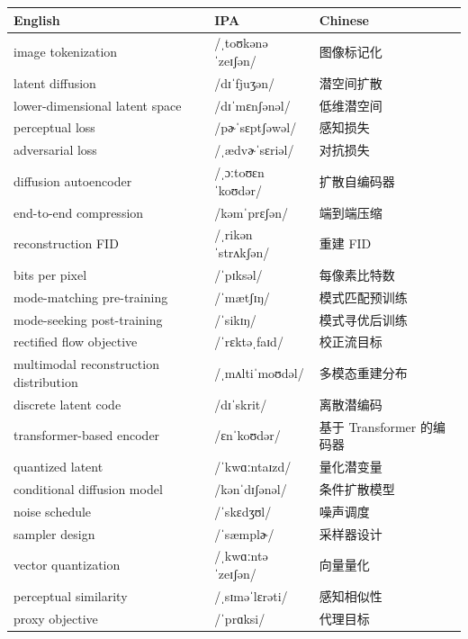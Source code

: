 \documentclass[UTF8,12pt,a4paper]{ctexart}
\providecommand{\zh}[1]{#1}
\begin{document}
\begin{tabular*}{\textwidth}{@{\extracolsep{\fill}}lll@{}}
\toprule
\textbf{English} & \textbf{IPA} & \textbf{Chinese} \\
\midrule
image tokenization & {\ipafont /ˌtoʊkənəˈzeɪʃən/} & \zh{图像标记化} \\
latent diffusion & {\ipafont /dɪˈfjuʒən/} & \zh{潜空间扩散} \\
lower-dimensional latent space & {\ipafont /dɪˈmɛnʃənəl/} & \zh{低维潜空间} \\
perceptual loss & {\ipafont /pɚˈsɛptʃəwəl/} & \zh{感知损失} \\
adversarial loss & {\ipafont /ˌædvɚˈsɛriəl/} & \zh{对抗损失} \\
diffusion autoencoder & {\ipafont /ˌɔːtoʊɛnˈkoʊdər/} & \zh{扩散自编码器} \\
end-to-end compression & {\ipafont /kəmˈprɛʃən/} & \zh{端到端压缩} \\
reconstruction FID & {\ipafont /ˌrikənˈstrʌkʃən/} & \zh{重建 FID} \\
bits per pixel & {\ipafont /ˈpɪksəl/} & \zh{每像素比特数} \\
mode-matching pre-training & {\ipafont /ˈmætʃɪŋ/} & \zh{模式匹配预训练} \\
mode-seeking post-training & {\ipafont /ˈsikɪŋ/} & \zh{模式寻优后训练} \\
rectified flow objective & {\ipafont /ˈrɛktəˌfaɪd/} & \zh{校正流目标} \\
multimodal reconstruction distribution & {\ipafont /ˌmʌltiˈmoʊdəl/} & \zh{多模态重建分布} \\
discrete latent code & {\ipafont /dɪˈskrit/} & \zh{离散潜编码} \\
transformer-based encoder & {\ipafont /ɛnˈkoʊdər/} & \zh{基于 Transformer 的编码器} \\
quantized latent & {\ipafont /ˈkwɑːntaɪzd/} & \zh{量化潜变量} \\
conditional diffusion model & {\ipafont /kənˈdɪʃənəl/} & \zh{条件扩散模型} \\
noise schedule & {\ipafont /ˈskɛdʒʊl/} & \zh{噪声调度} \\
sampler design & {\ipafont /ˈsæmplɚ/} & \zh{采样器设计} \\
vector quantization & {\ipafont /ˌkwɑːntəˈzeɪʃən/} & \zh{向量量化} \\
perceptual similarity & {\ipafont /ˌsɪməˈlɛrəti/} & \zh{感知相似性} \\
proxy objective & {\ipafont /ˈprɑksi/} & \zh{代理目标} \\

\end{tabular*}
\end{document}
